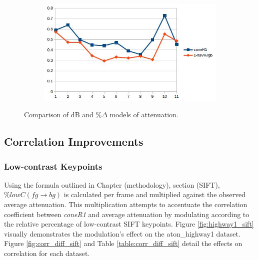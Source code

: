 \documentclass[12pt]{report}
\begin{document}
\begin{figure}
\begin{subfigure}{.49\linewidth}
  \caption{}
\end{subfigure}
\begin{subfigure}{.49\linewidth}
  \includegraphics[width=1\linewidth]{figures/correlations/rgb/pets2_hsv.jpg}
  \caption{}
\end{subfigure}

\caption{Comparison of dB and \%$\Delta$ models of attenuation. }
\label{fig:corr_compare}
\end{figure}

\subsection{Correlation Improvements}

\subsubsection{Low-contrast Keypoints} \label{section:lowcsensitivity}

Using the formula outlined in Chapter (methodology), section (SIFT), $\%lowC(fg \rightarrow bg)$ is calculated per frame and multiplied against the observed average attenuation. This multiplication attempts to accentuate the correlation coefficient between \textit{coneR1} and average attenuation by modulating according to the relative percentage of low-contrast SIFT keypoints. Figure \ref{fig:highway1_sift} visually demonstrates the modulation's effect on the aton\_highway1 dataset. Figure \ref{fig:corr_diff_sift} and Table \ref{table:corr_diff_sift} detail the effects on correlation for each dataset.
\end{document}
